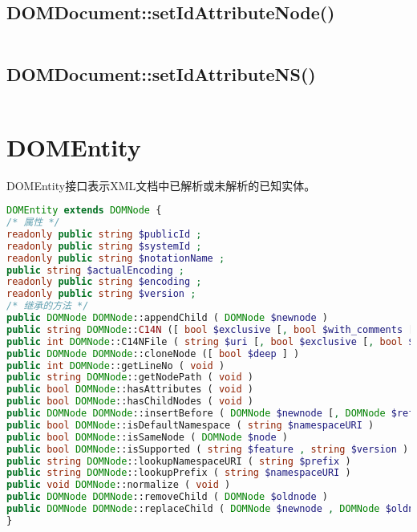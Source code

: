 \subsection{DOMDocument::setIdAttributeNode()}


\begin{lstlisting}[language=PHP]

\end{lstlisting}


\subsection{DOMDocument::setIdAttributeNS()}

\begin{lstlisting}[language=PHP]

\end{lstlisting}









\section{DOMEntity}

DOMEntity接口表示XML文档中已解析或未解析的已知实体。


\begin{lstlisting}[language=PHP]
DOMEntity extends DOMNode {
/* 属性 */
readonly public string $publicId ;
readonly public string $systemId ;
readonly public string $notationName ;
public string $actualEncoding ;
readonly public string $encoding ;
readonly public string $version ;
/* 继承的方法 */
public DOMNode DOMNode::appendChild ( DOMNode $newnode )
public string DOMNode::C14N ([ bool $exclusive [, bool $with_comments [, array $xpath [, array $ns_prefixes ]]]] )
public int DOMNode::C14NFile ( string $uri [, bool $exclusive [, bool $with_comments [, array $xpath [, array $ns_prefixes ]]]] )
public DOMNode DOMNode::cloneNode ([ bool $deep ] )
public int DOMNode::getLineNo ( void )
public string DOMNode::getNodePath ( void )
public bool DOMNode::hasAttributes ( void )
public bool DOMNode::hasChildNodes ( void )
public DOMNode DOMNode::insertBefore ( DOMNode $newnode [, DOMNode $refnode ] )
public bool DOMNode::isDefaultNamespace ( string $namespaceURI )
public bool DOMNode::isSameNode ( DOMNode $node )
public bool DOMNode::isSupported ( string $feature , string $version )
public string DOMNode::lookupNamespaceURI ( string $prefix )
public string DOMNode::lookupPrefix ( string $namespaceURI )
public void DOMNode::normalize ( void )
public DOMNode DOMNode::removeChild ( DOMNode $oldnode )
public DOMNode DOMNode::replaceChild ( DOMNode $newnode , DOMNode $oldnode )
}
\end{lstlisting}


